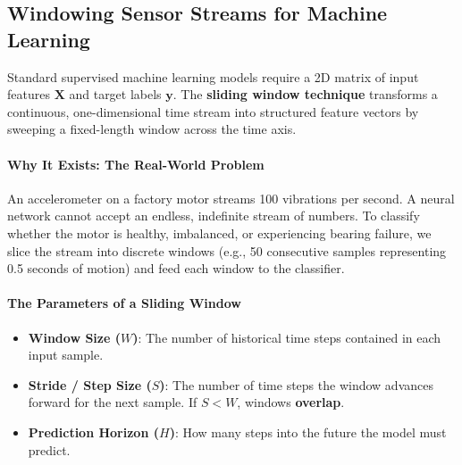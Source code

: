 \subsection{Windowing Sensor Streams for Machine Learning}

\begin{keyidea}
Standard supervised machine learning models require a 2D matrix of input features $\mathbf{X}$ and target labels $\mathbf{y}$. 
The \textbf{sliding window technique} transforms a continuous, one-dimensional time stream into structured feature vectors by sweeping a fixed-length window across the time axis.
\end{keyidea}

\paragraph{Why It Exists: The Real-World Problem}
An accelerometer on a factory motor streams 100 vibrations per second. A neural network cannot accept an endless, indefinite stream of numbers. To classify whether the motor is healthy, imbalanced, or experiencing bearing failure, we slice the stream into discrete windows (e.g., 50 consecutive samples representing 0.5 seconds of motion) and feed each window to the classifier.

\paragraph{The Parameters of a Sliding Window}
\begin{itemize}
    \item \textbf{Window Size ($W$)}: The number of historical time steps contained in each input sample.
    \item \textbf{Stride / Step Size ($S$)}: The number of time steps the window advances forward for the next sample. If $S < W$, windows \textbf{overlap}.
    \item \textbf{Prediction Horizon ($H$)}: How many steps into the future the model must predict.
\end{itemize}


